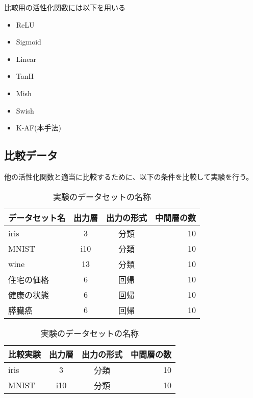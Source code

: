 比較用の活性化関数には以下を用いる
\begin{itemize}
    \setlength{\parskip}{0cm} %
    \setlength{\itemsep}{0cm} %
    \item ReLU
    \item Sigmoid
    \item Linear
    \item TanH
    \item Mish
    \item Swish
    \item K-AF(本手法)
\end{itemize}


\subsection{比較データ}

他の活性化関数と適当に比較するために、以下の条件を比較して実験を行う。


\begin{table}[htbp]
    \begin{center}
        \caption{実験のデータセットの名称}
        \vspace{5mm} 
        \begin{tabular}{l*{2}{c}r}
        データセット名      & 出力層 & 出力の形式 & 中間層の数 \\
        \hline
        iris            & 3  & 分類 & 10  \\
        MNIST               & i10 & 分類 & 10   \\
        wine        & 13 & 分類 & 10  \\
        住宅の価格           & 6 & 回帰 & 10  \\
        健康の状態           & 6 & 回帰 & 10  \\
        膵臓癌           & 6 & 回帰 & 10  \\
        \end{tabular}
    \end{center}
\end{table}

\begin{table}[htbp]
    \begin{center}
        \caption{実験のデータセットの名称}
        \vspace{5mm} 
        \begin{tabular}{l*{2}{c}r}
        比較実験      & 出力層 & 出力の形式 & 中間層の数 \\
        \hline
        iris            & 3  & 分類 & 10  \\
        MNIST               & i10 & 分類 & 10   \\
        \end{tabular}
    \end{center}
\end{table}


